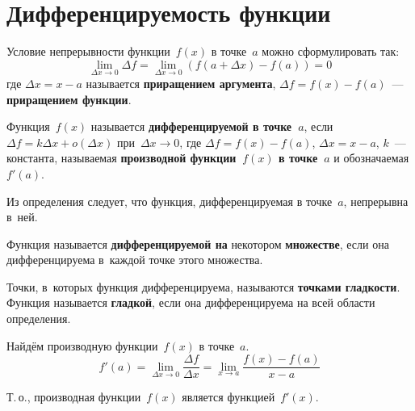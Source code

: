\section{Дифференцируемость функции}
Условие непрерывности функции~$f(x)$ в точке~$a$ можно сформулировать так:
\begin{equation*}
\lim_{\Delta x \to 0} \Delta f = \lim_{\Delta x \to 0} (f(a + \Delta x) - f(a)) = 0
\end{equation*}
где $\Delta x = x - a$ называется \textbf{приращением аргумента}, $\Delta f = f(x) - f(a)$~--- \textbf{приращением функции}.

 Функция~$f(x)$ называется \textbf{дифференцируемой в точке~$a$}, если
$\Delta f = k \Delta x + o(\Delta x)$ при~$\Delta x \to 0$, где
$\Delta f = f(x) - f(a)$,
$\Delta x = x - a$,
$k$~--- константа, называемая \textbf{производной функции~$f(x)$ в точке~$a$} и обозначаемая $f'(a)$.

Из определения следует, что функция, дифференцируемая в точке~$a$, непрерывна в~ней.

Функция называется \textbf{дифференцируемой на} некотором \textbf{множестве}, если она дифференцируема в~каждой точке этого множества.

 Точки, в~которых функция дифференцируема, называются \textbf{точками гладкости}.
Функция называется \textbf{гладкой}, если она дифференцируема на всей области определения.

Найдём производную функции~$f(x)$ в точке~$a$.
\begin{equation*}
f'(a) = \lim_{\Delta x \to 0} \frac{\Delta f}{\Delta x} = \lim_{x \to a} \frac{f(x) - f(a)}{x - a}
\end{equation*}

Т.\,о., производная функции~$f(x)$ является функцией~$f'(x)$.